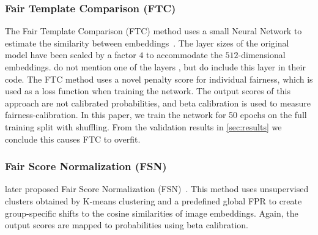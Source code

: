 \subsubsection{Fair Template Comparison (FTC)}
The Fair Template Comparison (FTC) method uses a small Neural Network to %
estimate the similarity between embeddings~\cite{terhorst2020comparison}.
The layer sizes of the original model %
have been scaled by a factor $4$ to accommodate the $512$-dimensional embeddings.
\citeauthor{salvador2022faircal} do not mention one of the layers%
, but do include this layer in their code.
The FTC method uses 
a novel penalty score for individual fairness, which is used as a loss function when training the network.
The output scores of this approach are not calibrated probabilities, and beta calibration is used to measure fairness-calibration.
In this paper, we train the network for 50 epochs on the full training split with shuffling.
From the validation results in \autoref{sec:results} we conclude this causes FTC to overfit.

\subsubsection{Fair Score Normalization (FSN)}
\citeauthor{terhorst2020post} later proposed Fair Score Normalization (FSN)~\cite{terhorst2020post}.
This method uses unsupervised clusters obtained by K-means clustering and a predefined global FPR to create group-specific shifts to the cosine similarities of image embeddings.
Again, the output scores are mapped to probabilities using beta calibration.

